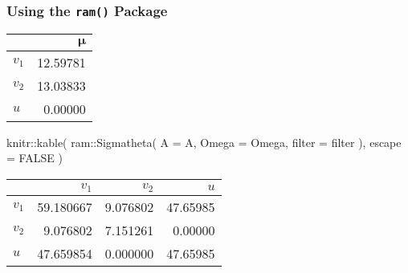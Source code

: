 \documentclass[
]{book}
\newenvironment{Shaded}{\begin{snugshade}}{\end{snugshade}}
\newcommand{\AttributeTok}[1]{\textcolor[rgb]{0.77,0.63,0.00}{#1}}
\newcommand{\ConstantTok}[1]{\textcolor[rgb]{0.00,0.00,0.00}{#1}}
\newcommand{\FunctionTok}[1]{\textcolor[rgb]{0.00,0.00,0.00}{#1}}
\newcommand{\NormalTok}[1]{#1}
\newcommand{\SpecialCharTok}[1]{\textcolor[rgb]{0.00,0.00,0.00}{#1}}
\newcommand{\StringTok}[1]{\textcolor[rgb]{0.31,0.60,0.02}{#1}}
\begin{document}
\hypertarget{using-the-ram-package}{%
\subsubsection{\texorpdfstring{Using the \texttt{ram()} Package}{Using the ram() Package}}\label{using-the-ram-package}}

\begin{Shaded}
\end{Shaded}

\begin{tabular}{l|r}
\hline
  & $\boldsymbol{\mu}$\\
\hline
$v_1$ & 12.59781\\
\hline
$v_2$ & 13.03833\\
\hline
$u$ & 0.00000\\
\hline
\end{tabular}

\begin{Shaded}
\begin{Highlighting}[]
\NormalTok{knitr}\SpecialCharTok{::}\FunctionTok{kable}\NormalTok{(}
\NormalTok{  ram}\SpecialCharTok{::}\FunctionTok{Sigmatheta}\NormalTok{(}
    \AttributeTok{A =}\NormalTok{ A,}
    \AttributeTok{Omega =}\NormalTok{ Omega,}
    \AttributeTok{filter =}\NormalTok{ filter}
\NormalTok{  ),}
  \AttributeTok{escape =} \ConstantTok{FALSE}
\NormalTok{)}
\end{Highlighting}
\end{Shaded}

\begin{tabular}{l|r|r|r}
\hline
  & $v_1$ & $v_2$ & $u$\\
\hline
$v_1$ & 59.180667 & 9.076802 & 47.65985\\
\hline
$v_2$ & 9.076802 & 7.151261 & 0.00000\\
\hline
$u$ & 47.659854 & 0.000000 & 47.65985\\
\hline
\end{tabular}
\end{document}
